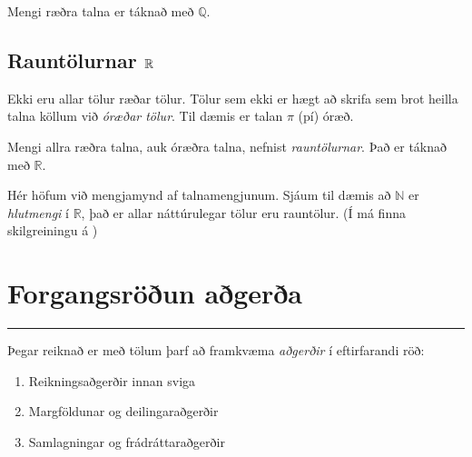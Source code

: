 \documentclass[a4paper,10pt,icelandic]{sphinxmanual}
\begin{document}
Mengi ræðra talna er táknað með \(\mathbb{Q}\).


\subsection{Rauntölurnar \protect\(\mathbb{R}\protect\)}
\label{\detokenize{Kafli01:rauntolurnar-mathbb-r}}
Ekki eru allar tölur ræðar tölur.
Tölur sem ekki er hægt að skrifa sem brot heilla talna köllum við \textit{óræðar tölur}.
Til dæmis er talan \(\pi\) (pí) óræð.

Mengi allra ræðra talna, auk óræðra talna, nefnist \textit{rauntölurnar}. Það er táknað með \(\mathbb{R}\).


Hér höfum við mengjamynd af talnamengjunum. Sjáum til dæmis að \(\mathbb{N}\) er \textit{hlutmengi} í \(\mathbb{R}\), það er allar náttúrulegar tölur eru rauntölur.
(Í {\hyperref[\detokenize{Kafli04:s-mengi}]{}} má finna skilgreiningu á {\hyperref[\detokenize{Kafli04:s-hlutmengi}]{}})


\section{Forgangsröðun aðgerða}
\label{\detokenize{Kafli01:forgangsroun-agera}}

\bigskip\hrule\bigskip


Þegar reiknað er með tölum þarf að framkvæma \textit{aðgerðir} í eftirfarandi röð:
\begin{enumerate}
%
\item {} 
Reikningsaðgerðir innan sviga

\item {} 
Margföldunar\sphinxhyphen{} og deilingaraðgerðir

\item {} 
Samlagningar\sphinxhyphen{} og frádráttaraðgerðir

\end{enumerate}
\end{document}
